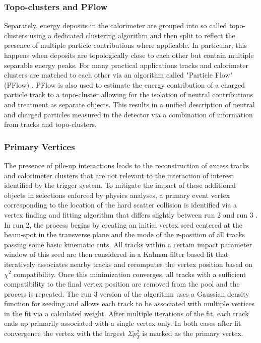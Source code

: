 \subsubsection*{Topo-clusters and PFlow}

Separately, energy deposits in the calorimeter are grouped into so called topo-clusters using a dedicated clustering 
algorithm \cite{atlas-calo-cluster} and then split to reflect the presence of multiple particle contributions where 
applicable. In particular, this happens when deposits are topologically close to each other but contain multiple 
separable energy peaks. For many practical applications tracks and calorimeter clusters are matched to each other via 
an algorithm called "Particle Flow" (PFlow) \cite{atlas-pflow}. PFlow is also used to estimate the energy contribution 
of a charged particle track to a topo-cluster allowing for the isolation of neutral contributions and treatment as 
separate objects. This results in a unified description of neutral and charged particles measured in the detector 
via a combination of information from tracks and topo-clusters. \par

\subsubsection*{Primary Vertices}

The presence of pile-up interactions leads to the reconstruction of excess tracks and calorimeter clusters that are not 
relevant to the interaction of interest identified by the trigger system. To mitigate the impact of these additional 
objects in selections enforced by physics analyses, a primary event vertex corresponding to the location of the hard 
scatter collision is identified via a vertex finding and fitting algorithm that differs slightly between run 2 and run 3 
\cite{atlas-vertex-reco-run2, atlas-vertex-reco-run3}. In run 2, the process begins by creating an initial vertex seed 
centered at the beam-spot in the transverse plane and the mode of the z-position of all tracks passing some basic 
kinematic cuts. All tracks within a certain impact parameter window of this seed are then considered in a Kalman filter 
based fit that iteratively associates nearby tracks and recomputes the vertex position based on $\chi^2$ compatibility. 
Once this minimization converges, all tracks with a sufficient compatibility to the final vertex position are removed 
from the pool and the process is repeated. The run 3 version of the algorithm uses a Gaussian density function for 
seeding and allows each track to be associated with multiple vertices in the fit via a calculated weight. After multiple 
iterations of the fit, each track ends up primarily associated with a single vertex only. In both cases after fit 
convergence the vertex with the largest $\Sigma p_T^2$ is marked as the primary vertex. \par

